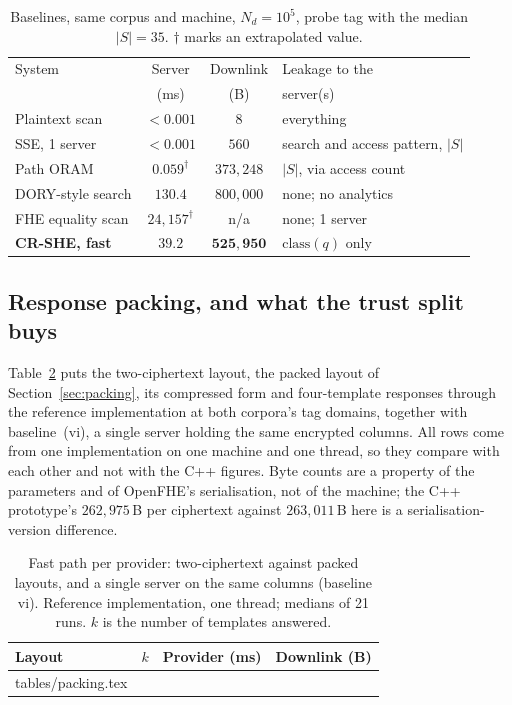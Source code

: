 \documentclass[a4paper,fleqn]{cas-sc}
\begin{document}
\begin{table}[pos=htbp]
\caption{Baselines, same corpus and machine, $N_d=10^5$, probe tag with the
median $|S|=35$. $\dagger$ marks an extrapolated value.}
\label{tab:baselines}
\centering
\footnotesize
\setlength{\tabcolsep}{3pt}
\renewcommand{\arraystretch}{1.2}
\begin{tabular}{@{}lcc>{\raggedright\arraybackslash}p{2.1cm}@{}}
\toprule
System & Server & Downlink & Leakage to the \\
       & (ms)   & (B)      & server(s) \\
\midrule
Plaintext scan        & $<0.001$ & $8$              & everything \\
SSE, 1 server         & $<0.001$ & $560$            & search and access
pattern, $|S|$ \\
Path ORAM             & $0.059^{\dagger}$ & $373{,}248$ & $|S|$, via access
count \\
DORY-style search     & $130.4$  & $800{,}000$      & none; no analytics \\
FHE equality scan     & $24{,}157^{\dagger}$ & n/a & none; 1 server \\
\midrule
\textbf{CR-SHE, fast} & $\mathbf{39.2}$ & $\mathbf{525{,}950}$ &
$\mathrm{class}(q)$ only \\
\bottomrule
\end{tabular}
\end{table}

\subsection{Response packing, and what the trust split buys}
\label{sec:packresult}
Table~\ref{tab:packing} puts the two-ciphertext layout, the packed layout of
Section~\ref{sec:packing}, its compressed form and four-template responses
through the reference implementation at both corpora's tag domains, together
with baseline~(vi), a single server holding the same encrypted columns. All
rows come from one implementation on one machine and one thread, so they
compare with each other and not with the C++ figures. Byte counts are a
property of the parameters and of OpenFHE's serialisation, not of the
machine; the C++ prototype's $262{,}975$\,B per ciphertext against
$263{,}011$\,B here is a serialisation-version difference.

\begin{table}[pos=htbp]
\caption{Fast path per provider: two-ciphertext against packed layouts, and a
single server on the same columns (baseline vi). Reference implementation,
one thread; medians of 21 runs. $k$ is the number of templates answered.}
\label{tab:packing}
\centering
\footnotesize
\setlength{\tabcolsep}{3pt}
\begin{tabular*}{\tblwidth}{@{\extracolsep{\fill}}lccc@{}}
\toprule
Layout & $k$ & Provider (ms) & Downlink (B) \\
\midrule
{} tables/packing.tex 
\end{tabular*}
\end{table}
\end{document}
